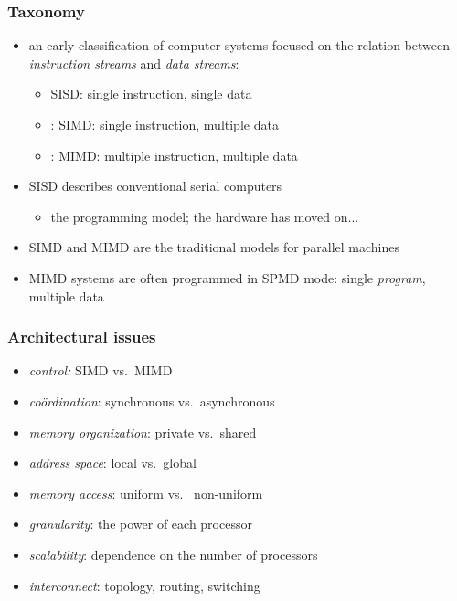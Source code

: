 \begin{frame}[fragile]
%
  \frametitle{Taxonomy}
%
  \begin{itemize}
%
  \item an early classification of computer systems focused on the relation between {\em
    instruction streams} and {\em data streams}:
    \begin{itemize}
      \item SISD: single instruction, single data
      \item: SIMD: single instruction, multiple data
      \item: MIMD: multiple instruction, multiple data
    \end{itemize}
%
    \item SISD describes conventional serial computers
    \begin{itemize}
      \item the programming model; the hardware has moved on...
    \end{itemize}
%
    \item SIMD and MIMD are the traditional models for parallel machines
%
    \item MIMD systems are often programmed in SPMD mode: single {\em program}, multiple data
  \end{itemize}
%
\end{frame}

\begin{frame}[fragile]
%
  \frametitle{Architectural issues}
%
  \begin{itemize}
%
  \item {\em control:} SIMD vs.~MIMD
  \item {\em co\"ordination}: synchronous vs.~asynchronous
  \item {\em memory organization}: private vs.~shared
  \item {\em address space}: local vs.~global
  \item {\em memory access}: uniform vs.~ non-uniform
  \item {\em granularity}: the power of each processor
  \item {\em scalability}: dependence on the number of processors
  \item {\em interconnect}: topology, routing, switching
%
  \end{itemize}
%
\end{frame}

